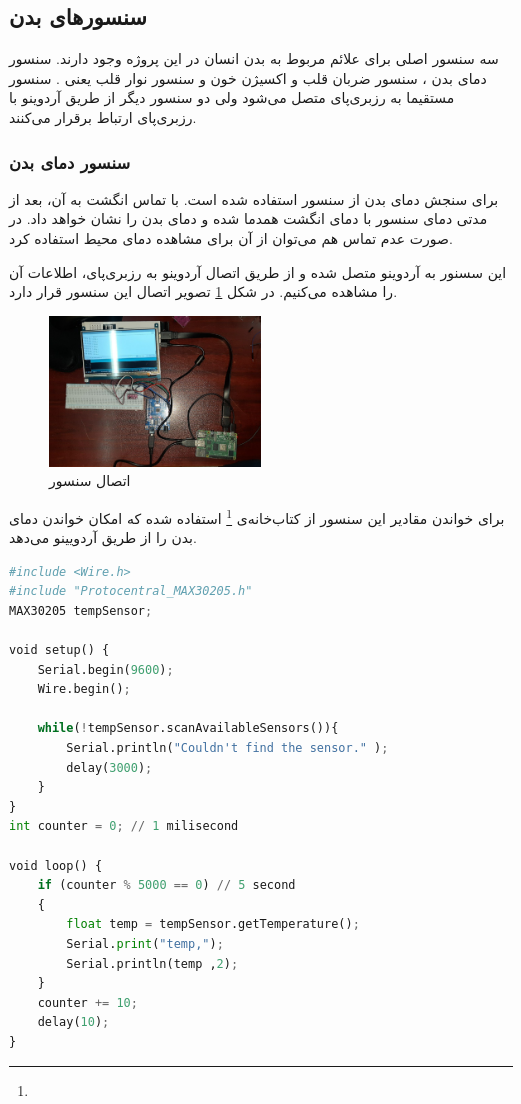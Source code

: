 \subsection{سنسورهای بدن}

سه سنسور اصلی برای علائم مربوط به بدن انسان در این پروژه وجود دارند. سنسور دمای بدن ، سنسور  ضربان قلب و اکسیژن خون  و سنسور نوار قلب یعنی . سنسور  مستقیما به رزبری‌پای متصل می‌شود ولی دو سنسور دیگر از طریق آردوینو با رزبری‌پای ارتباط برقرار می‌کنند.


\subsubsection{سنسور دمای بدن}



برای سنجش دمای بدن از سنسور  استفاده شده است. با تماس انگشت به آن، بعد از مدتی دمای سنسور با دمای انگشت همدما شده و دمای بدن را نشان خواهد داد. در صورت عدم تماس هم می‌توان از آن برای مشاهده دمای محیط استفاده کرد.

این سسنور به آردوینو متصل شده و از طریق اتصال آردوینو به رزبری‌پای، اطلاعات آن را مشاهده می‌کنیم. در شکل \ref{fig:4} تصویر اتصال این سنسور قرار دارد.

\begin{figure}[h]
	\centering
	\includegraphics[width=0.5\textwidth]{figs/max30205.jpg}
	
	\caption{اتصال سنسور }
	\label{fig:4}
\end{figure}


برای خواندن مقادیر این سنسور از کتاب‌خانه‌ی
\footnote{}
 استفاده شده که امکان خواندن دمای بدن را از طریق آردویینو می‌دهد.

\begin{latin}
	\begin{lstlisting}[language=python]
#include <Wire.h>
#include "Protocentral_MAX30205.h"
MAX30205 tempSensor;

void setup() {
	Serial.begin(9600);
	Wire.begin();
	
	while(!tempSensor.scanAvailableSensors()){
		Serial.println("Couldn't find the sensor." );
		delay(3000);
	}
}
int counter = 0; // 1 milisecond

void loop() {	
	if (counter % 5000 == 0) // 5 second
	{
		float temp = tempSensor.getTemperature(); 
		Serial.print("temp,");
		Serial.println(temp ,2);
	}
	counter += 10;
	delay(10);
}

\end{lstlisting}
\end{latin}

